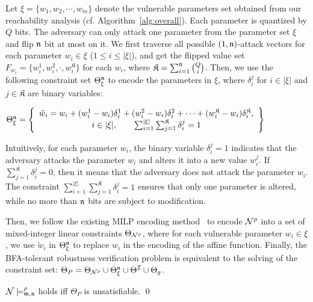 Let $\xi=\{w_1,w_2,\cdots,w_m\}$ denote the vulnerable parameters set obtained from our reachability analysis (cf. Algorithm~\ref{alg:overall}). Each parameter is quantized by $Q$ bits. The adversary can only attack one parameter from the parameter set $\xi$ and flip $\nn$ bit at most on it. We first traverse all possible $(1,\nn)$-attack vectors for each parameter $w_i \in \xi$ ($1\le i\le|\xi|$), and get the flipped value set $F_{w_i}=\{w_i^1, w_i^2, \cdot, w_i^{\mathfrak{K}}\}$ for each $w_i$, where $\mathfrak{K}= \sum_{i=1}^\nn \binom{Q}{i}$. Then, we use the following constraint set $\Theta_\xi^{\nn}$ to encode the parameters in $\xi$, where $\delta^j_i$ for $i\in|\xi|$ and $j\in\mathfrak{K}$ are binary variables:
\begin{center}
    $\Theta_{\xi}^\nn= \left\{
        \begin{array}{c}
        
             \tilde{w}_i = w_i + (w_i^1 - w_i) \delta_i^1 + (w_i^2 -w_i) \delta_i^2 + \cdots + (w_i^\mathfrak{K}-w_i) \delta_i^\mathfrak{K}, \\
                    
            i\in |\xi|,  \qquad \sum_{i=1}^{|\xi|} \sum_{j=1}^{\mathfrak{K}} \delta_i^j = 1 
        
        \end{array}\right\}$

\end{center}

Intuitively, for each parameter $w_i$, the binary variable $\delta^j_i=1$ indicates that the adversary attacks the parameter $w_i$ and alters it into a new value $w_i^j$. If $\sum_{j=1}^\mathfrak{K} \delta_i^j=0$, then it means that the adversary does not attack the parameter $w_i$. The constraint $\sum_{i=1}^{|\xi|} \sum_{j=1}^{\mathfrak{K}} \delta_i^j = 1 $ ensures that only one parameter is altered, while no more than $\mathfrak{n}$ bits are subject to modification.

Then, we follow the existing MILP encoding method~\cite{LomuscioM17} to encode ${\mathcal{N}}^\rho$ into a set of mixed-integer linear constraints $\Theta_{{\mathcal{N}}^\rho}$, where for each vulnerable parameter $w_i\in\xi$, we use $\tilde{w}_i$ in $\Theta_{\xi}^{\mathfrak{n}}$ to replace $w_i$ in the encoding of the affine function. 
% 
Finally, the BFA-tolerant robustness verification problem is equivalent to the solving of the constraint set: $\Theta_P= \Theta_{{\mathcal{N}}^\rho} \cup \Theta_{\xi}^{\mathfrak{n}} \cup \Theta^{\mathcal{I}} \cup \Theta_{g}$.

\begin{theorem}\label{the:complete}
    ${\mathcal{N}}\models^\rho_{\mathfrak{m},\mathfrak{n}}$ holds iff $\Theta_P$ is unsatisfiable.  \hfill \qed
\end{theorem}

